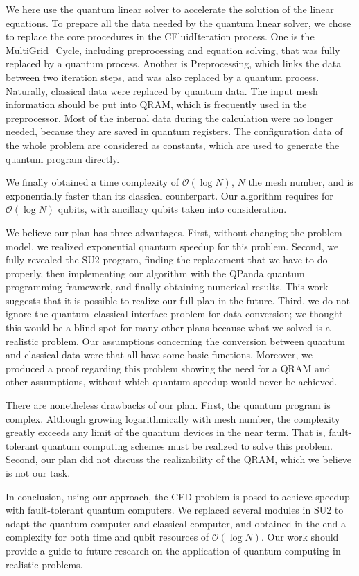 \documentclass[%
 reprint,
 amsmath,amssymb,
pra,
]{revtex4-1}
\begin{document}
We here use the quantum linear solver to accelerate the solution of the linear equations. To prepare all the data needed by the quantum linear solver, we chose to replace the core procedures in the CFluidIteration process. One is the MultiGrid\_Cycle, including preprocessing and equation solving, that was fully replaced by a quantum process. Another is Preprocessing, which links the data between two iteration steps, and was also replaced by a quantum process. Naturally, classical data were replaced by quantum data. The input mesh information should be put into QRAM, which is frequently used in the preprocessor. Most of the internal data during the calculation were no longer needed, because they are saved in quantum registers. The configuration data of the whole problem are considered as constants, which are used to generate the quantum program directly.

We finally obtained a time complexity of $\mathcal{O}(\log N)$, $N$ the mesh number, and is exponentially faster than its classical counterpart. Our algorithm requires for $\mathcal{O}(\log N)$ qubits, with ancillary qubits taken into consideration.

We believe our plan has three advantages. First, without changing the problem model, we realized exponential quantum speedup for this problem. Second, we fully revealed the SU2 program, finding the replacement that we have to do properly, then implementing our algorithm with the QPanda quantum programming framework, and finally obtaining numerical results. This work suggests that it is possible to realize our full plan in the future. Third, we do not ignore the quantum--classical interface problem for data conversion; we thought this would be a blind spot for many other plans because what we solved is a realistic problem. Our assumptions concerning the conversion between quantum and classical data were that all have some basic functions. Moreover, we produced a proof regarding this problem showing the need for a QRAM and other assumptions, without which quantum speedup would never be achieved.

There are nonetheless drawbacks of our plan. First, the quantum program is complex. Although growing logarithmically with mesh number, the complexity greatly exceeds any limit of the quantum devices in the near term. That is, fault-tolerant quantum computing schemes must be realized to solve this problem. Second, our plan did not discuss the realizability of the QRAM, which we believe is not our task.

In conclusion, using our approach, the CFD problem is posed to achieve speedup with fault-tolerant quantum computers. We replaced several modules in SU2 to adapt the quantum computer and classical computer, and obtained in the end a complexity for both time and qubit resources of $\mathcal{O}(\log N)$. Our work should provide a guide to future research on the application of quantum computing in realistic problems.
\end{document}

